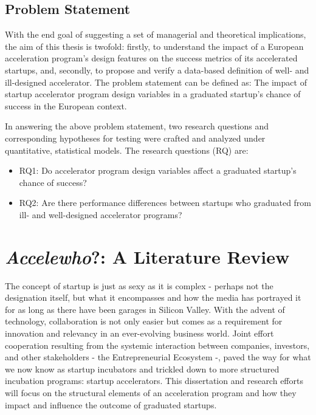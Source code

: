 \documentclass[
  12pt,
]{article}
\begin{document}
\hypertarget{problem-statement}{%
\subsection{Problem Statement}\label{problem-statement}}

With the end goal of suggesting a set of managerial and theoretical implications, the aim of this thesis is twofold: firstly, to understand the impact of a European acceleration program's design features on the success metrics of its accelerated startups, and, secondly, to propose and verify a data-based definition of well- and ill-designed accelerator. The problem statement can be defined as: The impact of startup accelerator program design variables in a graduated startup's chance of success in the European context.

In answering the above problem statement, two research questions and corresponding hypotheses for testing were crafted and analyzed under quantitative, statistical models. The research questions (RQ) are:

\begin{itemize}
\item
  RQ1: Do accelerator program design variables affect a graduated startup's chance of success?
\item
  RQ2: Are there performance differences between startups who graduated from ill- and well-designed accelerator programs?
\end{itemize}

\clearpage

\hypertarget{literature-review}{%
\section{\texorpdfstring{\emph{Accelewho}?: A Literature Review}{Accelewho?: A Literature Review}}\label{literature-review}}

The concept of startup is just as sexy as it is complex - perhaps not the designation itself, but what it encompasses and how the media has portrayed it for as long as there have been garages in Silicon Valley. With the advent of technology, collaboration is not only easier but comes as a requirement for innovation and relevancy in an ever-evolving business world. Joint effort cooperation resulting from the systemic interaction between companies, investors, and other stakeholders - the Entrepreneurial Ecosystem -, paved the way for what we now know as startup incubators and trickled down to more structured incubation programs: startup accelerators. This dissertation and research efforts will focus on the structural elements of an acceleration program and how they impact and influence the outcome of graduated startups.
\end{document}
